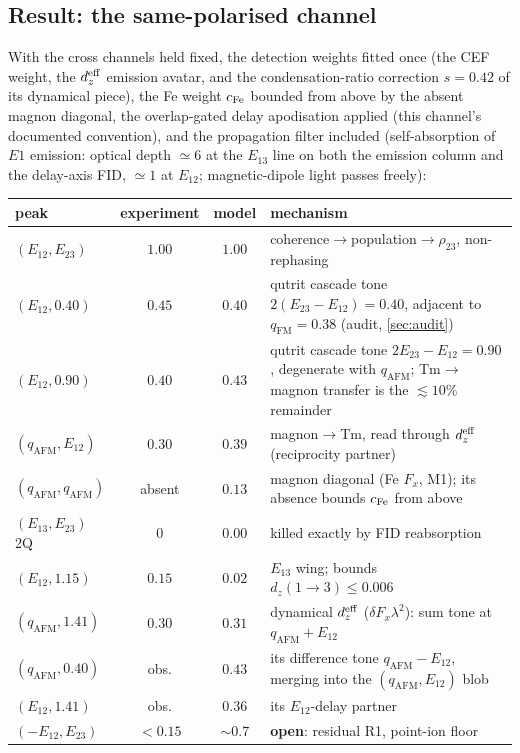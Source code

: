 \documentclass[11pt,a4paper]{article}
\newcommand{\qafm}{q_{\mathrm{AFM}}}
\newcommand{\qfm}{q_{\mathrm{FM}}}
\begin{document}
\subsection{Result: the same-polarised channel}
\label{sec:samepolfit}

With the cross channels held fixed, the detection weights fitted once
(the CEF weight, the $d_z^{\rm eff}$ emission avatar, and the
condensation-ratio correction $s=0.42$ of its dynamical piece), the
Fe weight $c_{\rm Fe}$ bounded from above by the absent magnon
diagonal, the overlap-gated delay apodisation applied (this
channel's documented convention), and the propagation filter included
(self-absorption of
$E1$ emission: optical depth $\simeq6$ at the $E_{13}$ line on both the
emission column and the delay-axis FID, $\simeq1$ at $E_{12}$;
magnetic-dipole light passes freely):
\begin{center}\small
\renewcommand{\arraystretch}{1.2}
\begin{tabular}{lccl}
\toprule
peak & experiment & model & mechanism\\
\midrule
$(E_{12},E_{23})$ & $1.00$ & $1.00$ &
  coherence$\to$population$\to\rho_{23}$, non-rephasing\\
$(E_{12},0.40)$ & $0.45$ & $0.40$ & qutrit cascade tone
  $2(E_{23}{-}E_{12})=0.40$, adjacent to $\qfm=0.38$ (audit,
  \cref{sec:audit})\\
$(E_{12},0.90)$ & $0.40$ & $0.43$ & qutrit cascade tone
  $2E_{23}{-}E_{12}=0.90$, degenerate with $\qafm$; Tm$\to$magnon
  transfer is the $\lesssim10\%$ remainder\\
$(\qafm,E_{12})$ & $0.30$ & $0.39$ &
  magnon$\to$Tm, read through $d_z^{\rm eff}$ (reciprocity partner)\\
$(\qafm,\qafm)$ & absent & $0.13$ & magnon diagonal (Fe $F_x$, M1);
  its absence bounds $c_{\rm Fe}$ from above\\
$(E_{13},E_{23})$ 2Q & $0$ & $0.00$ & killed exactly by FID reabsorption\\
$(E_{12},1.15)$ & $0.15$ & $0.02$ & $E_{13}$ wing; bounds
  $d_z(1\!\to\!3)\leq0.006$\\
$(\qafm,1.41)$ & $0.30$ & $0.31$ & dynamical $d_z^{\rm eff}$
  ($\delta F_x\lambda^2$): sum tone at $\qafm{+}E_{12}$\\
$(\qafm,0.40)$ & obs. & $0.43$ & its difference tone
  $\qafm{-}E_{12}$, merging into the $(\qafm,E_{12})$ blob\\
$(E_{12},1.41)$ & obs. & $0.36$ & its $E_{12}$-delay partner\\
$(-E_{12},E_{23})$ & $<0.15$ & $\sim0.7$ & \textbf{open}: residual R1, point-ion floor\\
\bottomrule
\end{tabular}
\end{center}
\end{document}

